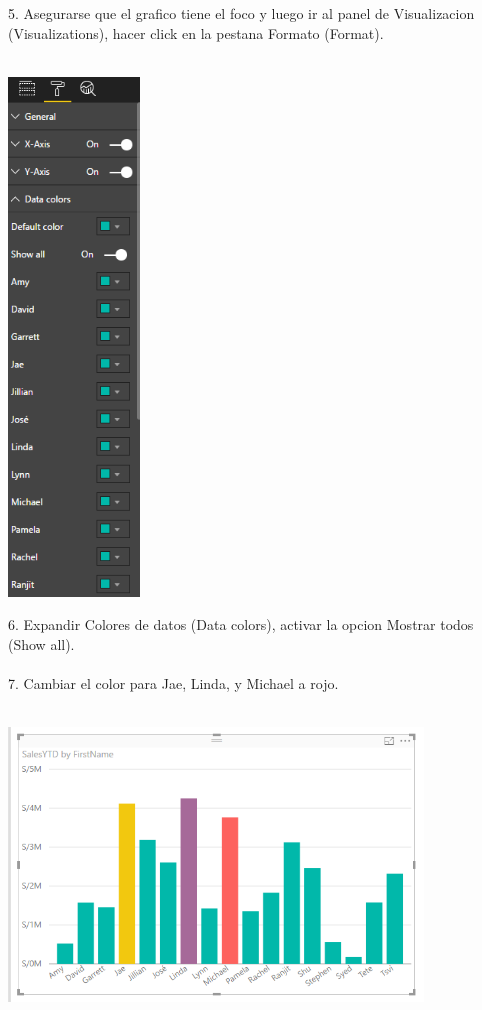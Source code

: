 \documentclass[12pt,letterpaper]{article}
\begin{document}
5. Asegurarse que el grafico tiene el foco y luego ir al panel de Visualizacion (Visualizations), hacer click en la
pestana Formato (Format).\\\\
\begin{center}
\includegraphics[width=3.5cm]{IMG/23.png} 
\end{center}
6. Expandir Colores de datos (Data colors), activar la opcion Mostrar todos (Show all).\\\\
7. Cambiar el color para Jae, Linda, y Michael a rojo.\\\\
\begin{center}
\includegraphics[width=11cm]{IMG/24.png} 
\end{center}
\end{document}
